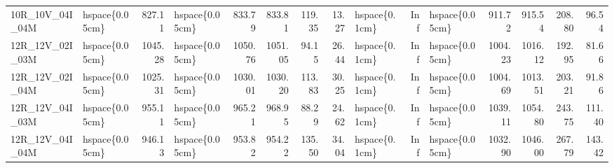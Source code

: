 \begin{tabular}{llrlrrrrlrlrrrr}
10R\_10V\_04I\_04M & hspace\{0.05cm\} & 827.11 & hspace\{0.05cm\} & 833.79 & 833.81 & 119.35 & 13.27 & hspace\{0.1cm\} & Inf & hspace\{0.05cm\} & 911.72 & 915.54 & 208.80 & 96.54\\
\addlinespace
12R\_12V\_02I\_03M & hspace\{0.05cm\} & 1045.28 & hspace\{0.05cm\} & 1050.76 & 1051.05 & 94.15 & 26.44 & hspace\{0.1cm\} & Inf & hspace\{0.05cm\} & 1004.23 & 1016.12 & 192.95 & 81.66\\
12R\_12V\_02I\_04M & hspace\{0.05cm\} & 1025.31 & hspace\{0.05cm\} & 1030.01 & 1030.20 & 113.83 & 30.25 & hspace\{0.1cm\} & Inf & hspace\{0.05cm\} & 1004.69 & 1013.51 & 203.21 & 91.86\\
12R\_12V\_04I\_03M & hspace\{0.05cm\} & 955.11 & hspace\{0.05cm\} & 965.21 & 968.95 & 88.29 & 24.62 & hspace\{0.1cm\} & Inf & hspace\{0.05cm\} & 1039.11 & 1054.80 & 243.75 & 111.40\\
12R\_12V\_04I\_04M & hspace\{0.05cm\} & 946.13 & hspace\{0.05cm\} & 953.82 & 954.22 & 135.50 & 34.04 & hspace\{0.1cm\} & Inf & hspace\{0.05cm\} & 1032.90 & 1046.00 & 267.79 & 143.42\\
\bottomrule
\end{tabular}

